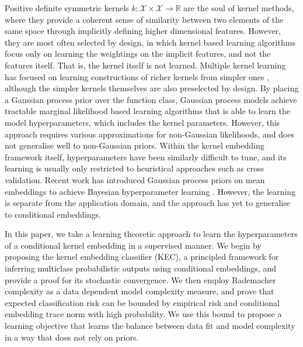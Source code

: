 \documentclass{article}
\begin{document}
	Positive definite symmetric kernels $k : \mathcal{X} \times \mathcal{X} \to \mathbb{R}$ are the soul of kernel methods, where they provide a coherent sense of similarity between two elements of the same space through implicitly defining higher dimensional features. However, they are most often selected by design, in which kernel based learning algorithms focus only on learning the weightings on the implicit features, and not the features itself. That is, the kernel itself is not learned. Multiple kernel learning has focused on learning constructions of richer kernels from simpler ones \citep{gonen2011multiple, zien2007multiclass}, although the simpler kernels themselves are also preselected by design. By placing a Gaussian process prior over the function class, Gaussian process models \citep{rasmussen2006gaussian} achieve tractable marginal likelihood based learning algorithms that is able to learn the model hyperparameters, which includes the kernel parameters. However, this approach requires various approximations for non-Gaussian likelihoods, and does not generalise well to non-Gaussian priors. Within the kernel embedding framework itself, hyperparameters have been similarly difficult to tune, and its learning is usually only restricted to heuristical approaches such as cross validation. Recent work has introduced Gaussian process priors on mean embeddings to achieve Bayesian hyperparameter learning \citep{flaxman2016bayesian}. However, the learning is separate from the application domain, and the approach has yet to generalise to conditional embeddings.
	
	In this paper, we take a learning theoretic approach to learn the hyperparameters of a conditional kernel embedding in a supervised manner. We begin by proposing the kernel embedding classifier (KEC), a principled framework for inferring multiclass probabilistic outputs using conditional embeddings, and provide a proof for its stochastic convergence. We then employ Rademacher complexity as a data dependent model complexity measure, and prove that expected classification risk can be bounded by empirical risk and conditional embedding trace norm with high probability. We use this bound to propose a learning objective that learns the balance between data fit and model complexity in a way that does not rely on priors.
	
\end{document}
